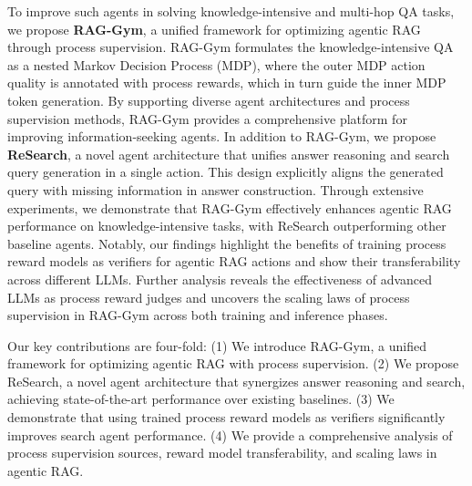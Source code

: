 To improve such agents in solving knowledge-intensive and multi-hop QA tasks, we propose \textbf{RAG-Gym}, a unified framework for optimizing agentic RAG through process supervision. RAG-Gym formulates the knowledge-intensive QA as a nested Markov Decision Process (MDP), where the outer MDP action quality is annotated with process rewards, which in turn guide the inner MDP token generation. By supporting diverse agent architectures and process supervision methods, RAG-Gym provides a comprehensive platform for improving information-seeking agents.
In addition to RAG-Gym, we propose \textbf{ReSearch}, a novel agent architecture that unifies answer reasoning and search query generation in a single action. This design explicitly aligns the generated query with missing information in answer construction. 
Through extensive experiments, we demonstrate that RAG-Gym effectively enhances agentic RAG performance on knowledge-intensive tasks, with ReSearch outperforming other baseline agents. Notably, our findings highlight the benefits of training process reward models as verifiers for agentic RAG actions and show their transferability across different LLMs. Further analysis reveals the effectiveness of advanced LLMs as process reward judges and uncovers the scaling laws of process supervision in RAG-Gym across both training and inference phases.

Our key contributions are four-fold: (1) We introduce RAG-Gym, a unified framework for optimizing agentic RAG with process supervision. (2) We propose ReSearch, a novel agent architecture that synergizes answer reasoning and search, achieving state-of-the-art performance over existing baselines. (3) We demonstrate that using trained process reward models as verifiers significantly improves search agent performance. (4) We provide a comprehensive analysis of process supervision sources, reward model transferability, and scaling laws in agentic RAG.